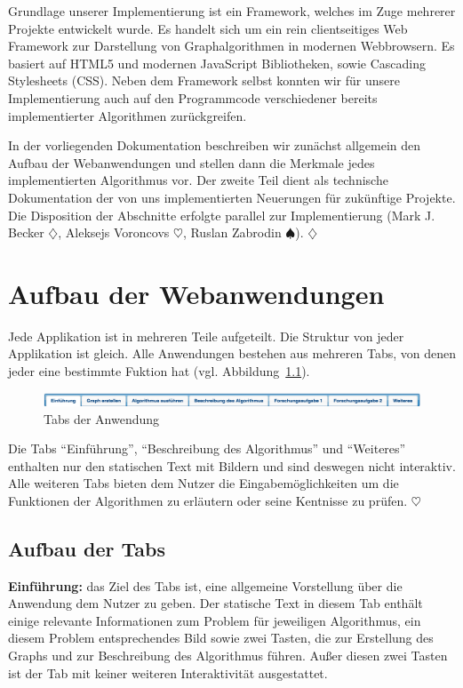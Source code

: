 Grundlage unserer Implementierung ist ein Framework, welches im Zuge mehrerer Projekte entwickelt wurde. Es handelt sich um ein rein clientseitiges Web Framework zur Darstellung von Graphalgorithmen in modernen Webbrowsern. Es basiert auf HTML5 und modernen Java\-Script Bibliotheken, sowie Cascading Stylesheets (CSS). Neben dem Framework selbst konnten wir für unsere Implementierung auch auf den Programmcode verschiedener bereits implementierter Algorithmen zurückgreifen.

In der vorliegenden Dokumentation beschreiben wir zunächst allgemein den Aufbau der Webanwendungen und stellen dann die Merkmale jedes implementierten Algorithmus vor. Der zweite Teil dient als technische Dokumentation der von uns implementierten Neuerungen für zukünftige Projekte. Die Disposition der Abschnitte erfolgte parallel zur Implementierung (Mark J. Becker $\diamondsuit$, Aleksejs Voroncovs $\heartsuit$, Ruslan Zabrodin $\spadesuit$). \hfill$\diamondsuit$

\chapter{Aufbau der Webanwendungen} %
Jede Applikation ist in mehreren Teile aufgeteilt. Die Struktur von jeder Applikation ist gleich. Alle Anwendungen bestehen aus mehreren Tabs, von denen jeder eine bestimmte Fuktion hat (vgl. Abbildung~\ref{fig:tabs}).

\begin{figure}[h!]
	\centering
	\includegraphics[width=\textwidth]{figures/tabs}
	\caption[Tabs der Anwendung]{Tabs der Anwendung}\label{fig:tabs}
\end{figure}

Die Tabs \enquote{Einführung}, \enquote{Beschreibung des Algorithmus} und \enquote{Weiteres} enthalten nur den statischen Text mit Bildern und sind deswegen nicht interaktiv. Alle weiteren Tabs bieten dem Nutzer die Eingabemöglichkeiten um die Funktionen der Algorithmen zu erläutern oder seine Kentnisse zu prüfen. \hfill$\heartsuit$

\section{Aufbau der Tabs} %
\textbf{Einführung:} das Ziel des Tabs ist, eine allgemeine Vorstellung über die Anwendung dem Nutzer zu geben. Der statische Text in diesem Tab enthält einige relevante Informationen zum Problem für jeweiligen Algorithmus, ein diesem Problem entsprechendes Bild sowie zwei Tasten, die zur Erstellung des Graphs und zur Beschreibung des Algorithmus führen. Außer diesen zwei Tasten ist der Tab mit keiner weiteren Interaktivität ausgestattet.

